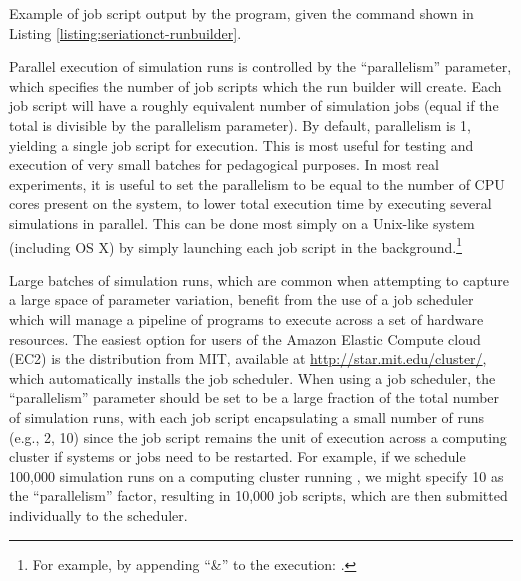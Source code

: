 \begin{listing}[!htp]
\inputminted{bash}{objects/runbuilder-job-output-example.sh}
\caption[Example of job script output by the  program]{Example of job script output by the  program, given the command shown in Listing \ref{listing:seriationct-runbuilder}. }
\label{listing:runbuilder-job}
\end{listing}

Parallel execution of simulation runs is controlled by the ``parallelism'' parameter, which specifies the number of job scripts which the run builder will create.  Each job script will have a roughly equivalent number of simulation jobs (equal if the total is divisible by the parallelism parameter).  By default, parallelism is 1, yielding a single job script for execution.  This is most useful for testing and execution of very small batches for pedagogical purposes.  In most real experiments, it is useful to set the parallelism to be equal to the number of CPU cores present on the system, to lower total execution time by executing several simulations in parallel.  This can be done most simply on a Unix-like system (including OS X) by simply launching each job script in the background.\footnote{For example, by appending ``\&'' to the execution:  .}

Large batches of simulation runs, which are common when attempting to capture a large space of parameter variation, benefit from the use of a job scheduler which will manage a pipeline of programs to execute across a set of hardware resources.  The easiest option for users of the Amazon Elastic Compute cloud (EC2) is the  distribution from MIT, available at \url{http://star.mit.edu/cluster/}, which automatically installs the  job scheduler.  When using a job scheduler, the ``parallelism'' parameter should be set to be a large fraction of the total number of simulation runs, with each job script encapsulating a small number of runs (e.g., 2, 10) since the job script remains the unit of execution across a computing cluster if systems or jobs need to be restarted.  For example, if we schedule 100,000 simulation runs on a computing cluster running , we might specify 10 as the ``parallelism'' factor, resulting in 10,000 job scripts, which are then submitted individually to the scheduler.





